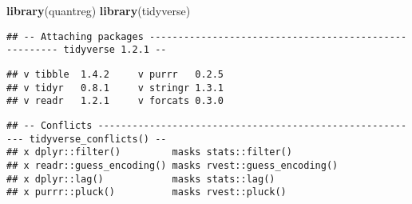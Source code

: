 \documentclass[]{article}
\newenvironment{Shaded}{\begin{snugshade}}{\end{snugshade}}
\newcommand{\KeywordTok}[1]{\textcolor[rgb]{0.13,0.29,0.53}{\textbf{#1}}}
\newcommand{\NormalTok}[1]{#1}
\begin{document}
\begin{Shaded}
\begin{Highlighting}[]
\KeywordTok{library}\NormalTok{(quantreg)}
\KeywordTok{library}\NormalTok{(tidyverse)}
\end{Highlighting}
\end{Shaded}

\begin{verbatim}
## -- Attaching packages ------------------------------------------------------ tidyverse 1.2.1 --
\end{verbatim}

\begin{verbatim}
## v tibble  1.4.2     v purrr   0.2.5
## v tidyr   0.8.1     v stringr 1.3.1
## v readr   1.2.1     v forcats 0.3.0
\end{verbatim}

\begin{verbatim}
## -- Conflicts --------------------------------------------------------- tidyverse_conflicts() --
## x dplyr::filter()         masks stats::filter()
## x readr::guess_encoding() masks rvest::guess_encoding()
## x dplyr::lag()            masks stats::lag()
## x purrr::pluck()          masks rvest::pluck()
\end{verbatim}
\end{document}
